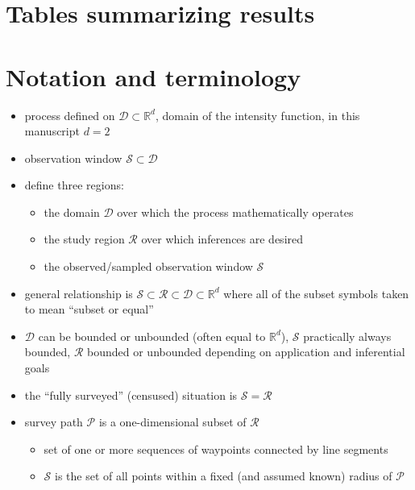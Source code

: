 \documentclass[review]{elsarticle}
\begin{document}
\section{Tables summarizing results}


\section{Notation and terminology}

\begin{itemize}

\item process defined on \(\mathcal{D} \subset \mathbb{R}^{d}\), domain of the
intensity function, in this manuscript \(d = 2\)

\item observation window \(\mathcal{S} \subset \mathcal{D}\)

\item define three regions:
\begin{itemize}
\item the domain \(\mathcal{D}\) over which the process mathematically operates
\item the study region \(\mathcal{R}\) over which inferences are desired
\item the observed/sampled observation window \(\mathcal{S}\)
\end{itemize}

\item general relationship is \(\mathcal{S} \subset \mathcal{R}
\subset \mathcal{D} \subset \mathbb{R}^{d}\) where all of the subset symbols
taken to mean ``subset or equal''

\item \(\mathcal{D}\) can be bounded or unbounded (often equal to
\(\mathbb{R}^{d}\)), $\mathcal{S}$ practically always bounded, \(\mathcal{R}\)
bounded or unbounded depending on application and inferential goals

\item the ``fully surveyed'' (censused) situation is
\(\mathcal{S} = \mathcal{R}\)

\item survey path \(\mathcal{P}\) is a one-dimensional subset of
\(\mathcal{R}\)
\begin{itemize}
\item set of one or more sequences of waypoints connected by line segments
\item \(\mathcal{S}\) is the set of all points within a fixed (and assumed
known) radius of \(\mathcal{P}\)
\end{itemize}


\end{itemize}
\end{document}
